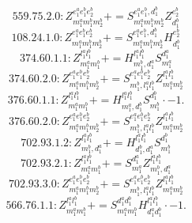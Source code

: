 \documentclass[letterpaper,10pt,fleqn,leqno,onecolumn]{article}
\begin{document}
\begin{equation} \;\;\;\;\;\;  559.75.2.0: Z^{e_{1}^{a}e_{1}^{b}e_{2}^{b}}_{m_{1}^{a}m_{1}^{b}m_{2}^{b}}+=S^{e_{1}^{a}e_{1}^{b},d_{1}^{b}}_{m_{1}^{a}m_{1}^{b}m_{2}^{b}}Z^{e_{2}^{b}}_{d_{1}^{b}} \end{equation}
\begin{equation} \;\;\;\;\;\;  108.24.1.0: Z^{e_{1}^{a}e_{1}^{b}e_{2}^{b}}_{m_{1}^{a}m_{1}^{b}m_{2}^{b}}+=S^{e_{1}^{a}e_{1}^{b},d_{1}^{b}}_{m_{1}^{a}m_{1}^{b}m_{2}^{b}}H^{e_{2}^{b}}_{d_{1}^{b}} \end{equation}
\begin{equation} \;\;\;\;\;\;  374.60.1.1: Z^{l_{1}^{a}l_{1}^{b}}_{m_{1}^{a}m_{1}^{b}}+=H^{l_{1}^{a}l_{1}^{b}}_{m_{1}^{b},d_{1}^{a}}S^{d_{1}^{a}}_{m_{1}^{a}} \end{equation}
\begin{equation} \;\;\;\;\;\;  374.60.2.0: Z^{e_{1}^{a}e_{1}^{b}e_{2}^{b}}_{m_{1}^{a}m_{1}^{b}m_{2}^{b}}+=S^{e_{1}^{a}e_{1}^{b}e_{2}^{b}}_{m_{1}^{b},l_{1}^{a}l_{1}^{b}}Z^{l_{1}^{a}l_{1}^{b}}_{m_{1}^{a}m_{2}^{b}} \end{equation}
\begin{equation} \;\;\;\;\;\;  376.60.1.1: Z^{l_{1}^{a}l_{1}^{b}}_{m_{1}^{a}m_{1}^{b}}+=H^{l_{1}^{a}l_{1}^{b}}_{m_{1}^{a},d_{1}^{b}}S^{d_{1}^{b}}_{m_{1}^{b}}\cdot -1. \end{equation}
\begin{equation} \;\;\;\;\;\;  376.60.2.0: Z^{e_{1}^{a}e_{1}^{b}e_{2}^{b}}_{m_{1}^{a}m_{1}^{b}m_{2}^{b}}+=S^{e_{1}^{a}e_{1}^{b}e_{2}^{b}}_{m_{1}^{b},l_{1}^{a}l_{1}^{b}}Z^{l_{1}^{a}l_{1}^{b}}_{m_{1}^{a}m_{2}^{b}} \end{equation}
\begin{equation} \;\;\;\;\;\;  702.93.1.2: Z^{l_{1}^{a}l_{1}^{b}}_{m_{1}^{b},d_{1}^{a}}+=H^{l_{1}^{a}l_{1}^{b}}_{d_{1}^{b},d_{1}^{a}}S^{d_{1}^{b}}_{m_{1}^{b}} \end{equation}
\begin{equation} \;\;\;\;\;\;  702.93.2.1: Z^{l_{1}^{a}l_{1}^{b}}_{m_{1}^{a}m_{1}^{b}}+=S^{d_{1}^{a}}_{m_{1}^{a}}Z^{l_{1}^{a}l_{1}^{b}}_{m_{1}^{b},d_{1}^{a}} \end{equation}
\begin{equation} \;\;\;\;\;\;  702.93.3.0: Z^{e_{1}^{a}e_{1}^{b}e_{2}^{b}}_{m_{1}^{a}m_{1}^{b}m_{2}^{b}}+=S^{e_{1}^{a}e_{1}^{b}e_{2}^{b}}_{m_{1}^{b},l_{1}^{a}l_{1}^{b}}Z^{l_{1}^{a}l_{1}^{b}}_{m_{1}^{a}m_{2}^{b}} \end{equation}
\begin{equation} \;\;\;\;\;\;  566.76.1.1: Z^{l_{1}^{a}l_{1}^{b}}_{m_{1}^{a}m_{1}^{b}}+=S^{d_{1}^{a}d_{1}^{b}}_{m_{1}^{a}m_{1}^{b}}H^{l_{1}^{a}l_{1}^{b}}_{d_{1}^{a}d_{1}^{b}}\cdot -1. \end{equation}
\end{document}
